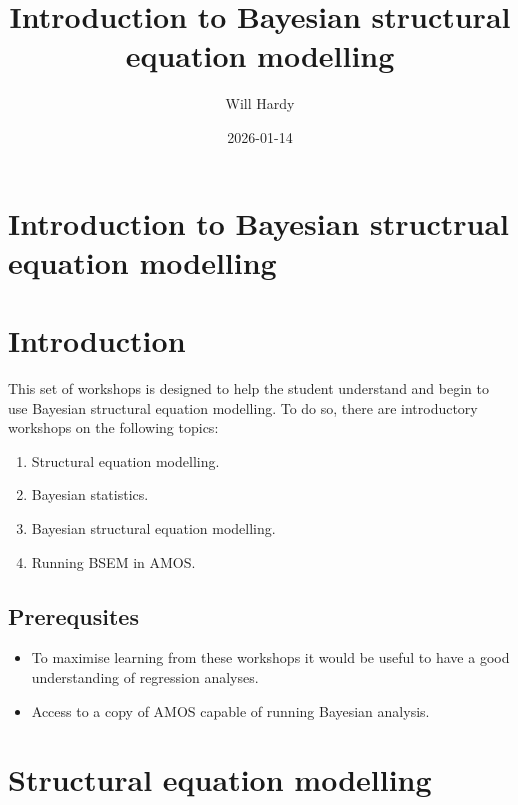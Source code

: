 \documentclass[
  a4paper,
  DIV=11,
  numbers=noendperiod]{scrreprt}
\title{Introduction to Bayesian structural equation modelling}
\author{Will Hardy}
\date{2026-01-14}
\providecommand{\tightlist}{%
  \setlength{\itemsep}{0pt}\setlength{\parskip}{0pt}}\usepackage{longtable,booktabs,array}
\renewcommand*\contentsname{Table of contents}
\newcommand\contentsname{Table of contents}
\begin{document}
\maketitle

\renewcommand*\contentsname{Table of contents}
{
\hypersetup{linkcolor=}
\setcounter{tocdepth}{2}
\tableofcontents
}


\chapter{Introduction to Bayesian structrual equation
modelling}\label{introduction-to-bayesian-structrual-equation-modelling}


\chapter{Introduction}\label{introduction}

This set of workshops is designed to help the student understand and
begin to use Bayesian structural equation modelling. To do so, there are
introductory workshops on the following topics:

\begin{enumerate}
\def\labelenumi{\arabic{enumi}.}
\tightlist
\item
  Structural equation modelling.
\item
  Bayesian statistics.
\item
  Bayesian structural equation modelling.
\item
  Running BSEM in AMOS.
\end{enumerate}

\section{Prerequsites}\label{prerequsites}

\begin{itemize}
\tightlist
\item
  To maximise learning from these workshops it would be useful to have a
  good understanding of regression analyses.
\item
  Access to a copy of AMOS capable of running Bayesian analysis.
\end{itemize}


\chapter{Structural equation
modelling}\label{structural-equation-modelling}
\end{document}
